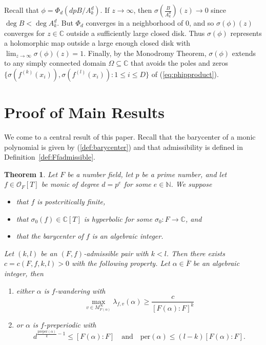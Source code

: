 \documentclass[12pt,oneside,a4]{amsart}
\newcommand{\IC}{\mathbb{C}}
\newcommand{\IN}{\mathbb{N}}
\newcommand{\cO}{\mathcal{O}}
\newcounter{maincounter}
\numberwithin{maincounter}{section}
\numberwithin{equation}{section}
\newtheorem{theorem}[maincounter]{Theorem}
\renewcommand{\subset}{\subseteq}
\begin{document}
Recall that $\phi = \Phi_d(dpB/A_k^d)$.
If $z\rightarrow\infty$, then
$\sigma(\frac{B}{A_k^d})(z)\rightarrow 0$
since $\deg B < \deg A_k^d$. But $\Phi_d$ converges in a
neighborhood of $0$, and so  $\sigma(\phi)(z)$ converges
for $z\in\IC$ outside a sufficiently large closed disk. Thus
$\sigma(\phi)$ represents a holomorphic map outside a large enough
closed disk
with $\lim_{z\rightarrow\infty}\sigma(\phi)(z)=1$. 
Finally, by the Monodromy Theorem, $\sigma(\phi)$ extends to any
simply connected domain $\Omega\subset\IC$
that avoids the poles and zeros 
$\{\sigma(f^{(k)}(x_i)), \sigma(f^{(l)}(x_i)) : 1\le i\le D\}$
of (\ref{eq:phipproduct}).




\section{Proof of Main Results}
\label{sec:proofs}

We come to a central result of this paper. Recall that the barycenter
of a monic polynomial is given by (\ref{def:barycenter}) and that
admissibility is defined in Definition~\ref{def:Ffadmissible}.


\begin{theorem}
  \label{thm:main}
  Let $F$ be a number field, let $p$ be a prime number, and let
  $f\in\cO_F[T]$ be monic of degree $d=p^e$
  for some $e\in\IN$.  We suppose
  \begin{itemize}
  \item that $f$ is postcritically finite,
  \item that $\sigma_0(f) \in\IC[T]$ is hyperbolic for some $\sigma_0\colon
    F\rightarrow\IC$, and
  \item that the
    barycenter of $f$ is an algebraic integer.
  \end{itemize}
  Let $(k,l)$ be an $(F,f)$-admissible pair with $k<l$. 
  Then there exists $c=c(F,f,k,l)>0$  with the following property. 
  Let $\alpha\in \overline F$ be an algebraic integer, 
  then 
  \begin{enumerate}
  \item [(i)] either $\alpha$ is $f$-wandering with
    \begin{equation}
      \label{eq:thmmainbound}
      \max_{v\in M^\infty_{F(\alpha)}}
      \lambda_{f,v}(\alpha)\ge \frac{c}{[F(\alpha):F]^{k}} 
    \end{equation}
  \item[(ii)] or $\alpha$ is $f$-preperiodic with
    \begin{equation*}
       d^{\frac{\mathrm{preper}(\alpha)}{k}-1} 
      \le
       [F(\alpha):F]
      \quad\text{and}\quad
      {\mathrm{per}(\alpha)} \le      
      (l-k)[F(\alpha):F]. 
    \end{equation*}
  \end{enumerate}
\end{theorem}
\end{document}

